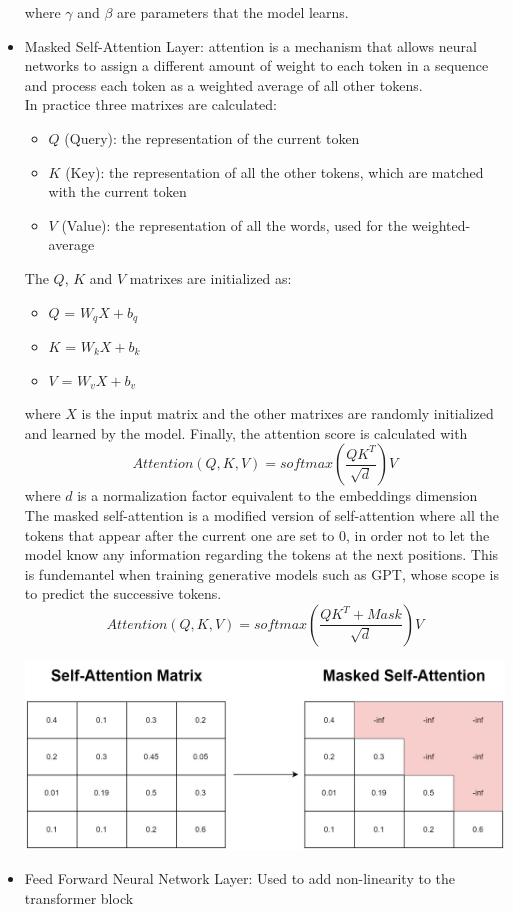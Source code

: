 \begin{itemize}
    where $\gamma$ and $\beta$ are parameters that the model learns.
    \item Masked Self-Attention Layer: attention is a mechanism that allows neural networks to assign a different amount of weight to each token in a sequence and process each token as a weighted average of all other tokens. \\
    In practice three matrixes are calculated:
    \begin{itemize}
        \item $Q$ (Query): the representation of the current token
        \item $K$ (Key): the representation of all the other tokens, which are matched with the current token
        \item $V$ (Value): the representation of all the words, used for the weighted-average
    \end{itemize}
    The $Q$, $K$ and $V$ matrixes are initialized as:
    \begin{itemize}
        \item $Q$ = $W_qX + b_q$ 
        \item $K$ = $W_kX + b_k$ 
        \item $V$ = $W_vX + b_v$
    \end{itemize}
    where $X$ is the input matrix and the other matrixes are randomly initialized and learned by the model.
    Finally, the attention score is calculated with
    \begin{equation*}
        Attention(Q,K,V) = softmax \left(\frac{QK^T}{\sqrt{d}}\right)V
    \end{equation*}
    where $d$ is a normalization factor equivalent to the embeddings dimension \\
    The masked self-attention is a modified version of self-attention where all the tokens that appear after the current one are set to $0$, in order not to let the model know any information regarding the tokens at the next positions. This is fundemantel when training generative models such as GPT, whose scope is to predict the successive tokens.
    \begin{equation*}
        Attention(Q,K,V) = softmax\left(\frac{QK^T + Mask}{\sqrt{d}}\right)V
    \end{equation*}

    \includegraphics[width=\textwidth]{images/masked_self_attention.drawio.png}

    \item Feed Forward Neural Network Layer: Used to add non-linearity to the transformer block
\end{itemize}

